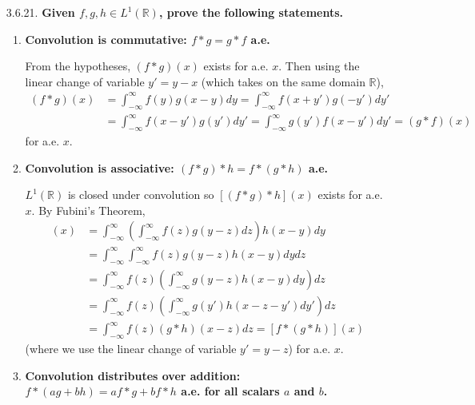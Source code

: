 \documentclass[a4paper,12pt]{article}
\begin{document}
\begin{enumerate}
    \item[3.6.21.]
        \boldmath\textbf{Given $f, g, h \in L^1(\mathbb{R})$, prove the following statements.
        }\unboldmath \par
        \begin{enumerate}
            \item
                \boldmath\textbf{Convolution is commutative: $f * g = g * f$ a.e.
                }\unboldmath \par
                From the hypotheses, $(f * g)(x)$ exists for a.e. $x$. Then using the linear change of variable $y' = y - x$ (which takes on the same domain $\mathbb{R}$),
                \begin{align*}
                    (f * g)(x) &= \int_{-\infty}^\infty f(y) g(x - y) dy = \int_{-\infty}^\infty f(x + y') g(-y') dy' \\
                    &= \int_{-\infty}^\infty f(x - y') g(y') dy' = \int_{-\infty}^\infty g(y') f(x - y') dy' = (g * f)(x)
                \end{align*}
                for a.e. $x$.
            \item
                \boldmath\textbf{Convolution is associative: $(f * g) * h = f * (g * h)$ a.e.
                }\unboldmath \par
                $L^1(\mathbb{R})$ is closed under convolution so $[(f * g) * h](x)$ exists for a.e. $x$. By Fubini's Theorem,
                \begin{align*}
                    [(f * g) * h](x) &= \int_{-\infty}^\infty \left( \int_{-\infty}^\infty f(z) g(y - z) dz \right) h(x - y) dy \\
                    &= \int_{-\infty}^\infty \int_{-\infty}^\infty f(z) g(y - z) h(x - y) dy dz \\
                    &= \int_{-\infty}^\infty f(z) \left( \int_{-\infty}^\infty g(y - z) h(x - y) dy \right) dz \\
                    &= \int_{-\infty}^\infty f(z) \left( \int_{-\infty}^\infty g(y') h(x - z - y') dy' \right) dz \\
                    &= \int_{-\infty}^\infty f(z) (g * h)(x - z) dz = [f * (g * h)](x)
                \end{align*}
                (where we use the linear change of variable $y' = y - z$) for a.e. $x$.
            \item
                \boldmath\textbf{Convolution distributes over addition: $f * (ag + bh) = af * g + bf * h$ a.e. for all scalars $a$ and $b$.
}
\end{enumerate}
\end{enumerate}
\end{document}
